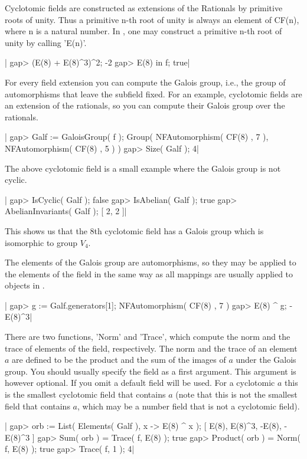 Cyclotomic  fields are constructed  as  extensions  of  the Rationals  by
primitive roots of unity.  Thus a primitive  n-th root of unity is always
an element  of CF(n), where  n  is a natural  number.  In {\GAP}, one may
construct a primitive n-th root of unity by calling 'E(n)'.

|    gap> (E(8) + E(8)^3)^2;
    -2
    gap> E(8) in f;
    true|

For every field  extension you  can compute  the  Galois group, i.e., the
group of automorphisms that  leave the subfield fixed.   For an  example,
cyclotomic fields are an extension of  the rationals, so  you can compute
their Galois group over the rationals.

|    gap> Galf := GaloisGroup( f );
    Group( NFAutomorphism( CF(8) , 7 ), NFAutomorphism( CF(8) , 5 ) )
    gap> Size( Galf );
    4|

The above cyclotomic field is  a small example where the  Galois group is
not cyclic.

|    gap> IsCyclic( Galf );
    false
    gap> IsAbelian( Galf );
    true
    gap> AbelianInvariants( Galf );
    [ 2, 2 ]|

This shows us that the 8th  cyclotomic field has a  Galois group which is
isomorphic to group $V_4$.

The elements of the Galois group are {\GAP} automorphisms, so they may be
applied to the elements of the field in the  same way as all mappings are
usually applied to objects in {\GAP}.

|    gap> g := Galf.generators[1];
    NFAutomorphism( CF(8) , 7 )
    gap> E(8) ^ g;
    -E(8)^3|

There are two functions,  'Norm' and 'Trace',  which compute the norm and
the trace of elements of the field, respectively.  The norm and the trace
of an element $a$ are defined to be the product and the sum of the images
of $a$ under the Galois group.  You should usually specify the field as a
first  argument.   This argument  is  however  optional.  If  you omit  a
default field will be  used.   For a cyclotomic $a$ this is  the smallest
cyclotomic field  that contains $a$ (note  that this is not  the smallest
field that  contains $a$, which may  be  a  number  field  that  is not a
cyclotomic field).

|    gap> orb := List( Elements( Galf ), x -> E(8) ^ x );
    [ E(8), E(8)^3, -E(8), -E(8)^3 ]
    gap> Sum( orb ) = Trace( f, E(8) );
    true
    gap> Product( orb ) = Norm( f, E(8) );
    true
    gap> Trace( f, 1 );
    4|

